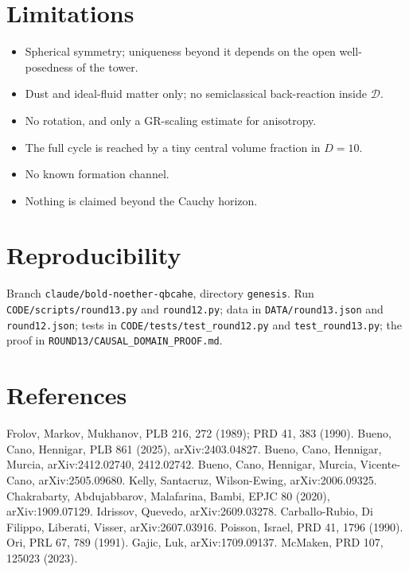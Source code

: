 \documentclass[11pt,a4paper]{article}
\theoremstyle{definition}\newtheorem{definition}[theorem]{Definition}
\theoremstyle{remark}\newtheorem{remark}[theorem]{Remark}
\begin{document}
\section{Limitations}
\begin{itemize}
\item Spherical symmetry; uniqueness beyond it depends on the open well-posedness of the tower.
\item Dust and ideal-fluid matter only; no semiclassical back-reaction inside $\mathcal D$.
\item No rotation, and only a GR-scaling estimate for anisotropy.
\item The full cycle is reached by a tiny central volume fraction in $D=10$.
\item No known formation channel.
\item Nothing is claimed beyond the Cauchy horizon.
\end{itemize}

\section*{Reproducibility}
Branch \texttt{claude/bold-noether-qbcahe}, directory \texttt{genesis}. Run \texttt{CODE/scripts/round13.py} and
\texttt{round12.py}; data in \texttt{DATA/round13.json} and \texttt{round12.json}; tests in \texttt{CODE/tests/test\_round12.py} and
\texttt{test\_round13.py}; the proof in \texttt{ROUND13/CAUSAL\_DOMAIN\_PROOF.md}.

\section*{References}\small
Frolov, Markov, Mukhanov, PLB 216, 272 (1989); PRD 41, 383 (1990).
Bueno, Cano, Hennigar, PLB 861 (2025), arXiv:2403.04827.
Bueno, Cano, Hennigar, Murcia, arXiv:2412.02740, 2412.02742.
Bueno, Cano, Hennigar, Murcia, Vicente-Cano, arXiv:2505.09680.
Kelly, Santacruz, Wilson-Ewing, arXiv:2006.09325.
Chakrabarty, Abdujabbarov, Malafarina, Bambi, EPJC 80 (2020), arXiv:1909.07129.
Idrissov, Quevedo, arXiv:2609.03278.
Carballo-Rubio, Di Filippo, Liberati, Visser, arXiv:2607.03916.
Poisson, Israel, PRD 41, 1796 (1990). Ori, PRL 67, 789 (1991).
Gajic, Luk, arXiv:1709.09137. McMaken, PRD 107, 125023 (2023).
\end{document}
